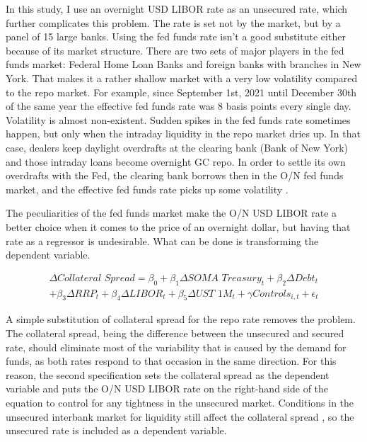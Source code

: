 \documentclass[11pt,a4paper,english,oneside]{article}
\begin{document}
In this study, I use an overnight USD LIBOR rate as an unsecured rate, which further complicates this problem. The rate is set not by the market, but by a panel of 15 large banks. Using the fed funds rate isn't a good substitute either because of its market structure. There are two sets of major players in the fed funds market: Federal Home Loan Banks and foreign banks with branches in New York. That makes it a rather shallow market with a very low volatility compared to the repo market. For example, since September 1st, 2021 until December 30th of the same year the effective fed funds rate was 8 basis points every single day. Volatility is almost non-existent. Sudden spikes in the fed funds rate sometimes happen, but only when the intraday liquidity in the repo market dries up. In that case, dealers keep daylight overdrafts at the clearing bank (Bank of New York) and those intraday loans become overnight GC repo. In order to settle its own overdrafts with the Fed, the clearing bank borrows then in the O/N fed funds market, and the effective fed funds rate picks up some volatility \citep{gmn22}.

The peculiarities of the fed funds market make the O/N USD LIBOR rate a better choice when it comes to the price of an overnight dollar, but having that rate as a regressor is undesirable. What can be done is transforming the dependent variable.

\begin{equation} \label{eq:2}
  \begin{gathered}
    \Delta \textit{Collateral Spread} = \beta_0 + \beta_1 \Delta \textit{SOMA Treasury}_t + \beta_2 \Delta \textit{Debt}_t \\ + \beta_3 \Delta \textit{RRP}_t + \beta_4 \Delta \textit{LIBOR}_t + \beta_5 \Delta \textit{UST 1M}_t + \gamma \textit{Controls}_{i,t} + \epsilon_{t}
  \end{gathered}
\end{equation}

A simple substitution of collateral spread for the repo rate removes the problem. The collateral spread, being the difference between the unsecured and secured rate, should eliminate most of the variability that is caused by the demand for funds, as both rates respond to that occasion in the same direction. For this reason, the second specification sets the collateral spread as the dependent variable and puts the O/N USD LIBOR rate on the right-hand side of the equation to control for any tightness in the unsecured market. Conditions in the unsecured interbank market for liquidity still affect the collateral spread \citep{nyborg2019a}, so the unsecured rate is included as a dependent variable.
\end{document}
